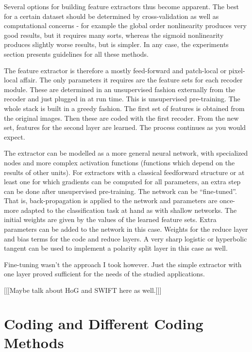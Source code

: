 \documentclass[12pt,a4paper,oneside,english]{UPBThesis}
\begin{document}
Several options for building feature extractors thus become apparent. The best for a certain dataset should be determined by cross-validation as well as computational concerns - for example the global order nonlinearity produces very good results, but it requires many sorts, whereas the sigmoid nonlinearity produces slightly worse results, but is simpler. In any case, the experiments section presents guidelines for all these methods.

The feature extractor is therefore a mostly feed-forward and patch-local or pixel-local affair. The only parameters it requires are the feature sets for each recoder module. These are determined in an unsupervised fashion externally from the recoder and just plugged in at run time. This is unsupervised pre-training. The whole stack is built in a greedy fashion. The first set of features is obtained from the original images. Then these are coded with the first recoder. From the new set, features for the second layer are learned. The process continues as you would expect. 

The extractor can be modelled as a more general neural network, with specialized nodes and more complex activation functions (functions which depend on the results of other units). For extractors with a classical feedforward structure or at least one for which gradients can be computed for all parameters, an extra step can be done after unsupervised pre-training. The network can be ``fine-tuned''. That is, back-propagation is applied to the network and parameters are once-more adapted to the classification task at hand as with shallow networks. The initial weights are given by the values of the learned feature sets. Extra parameters can be added to the network in this case. Weights for the reduce layer and bias terms for the code and reduce layers. A very sharp logistic or hyperbolic tangent can be used to implement a polarity split layer in this case as well.

Fine-tuning wasn't the approach I took however. Just the simple extractor with one layer proved sufficient for the needs of the studied applications. 

[[[Maybe talk about HoG and SWIFT here as well.]]]

\chapter{Coding and Different Coding Methods}
\label{chap:CodingAndCodingMethods}
\end{document}
